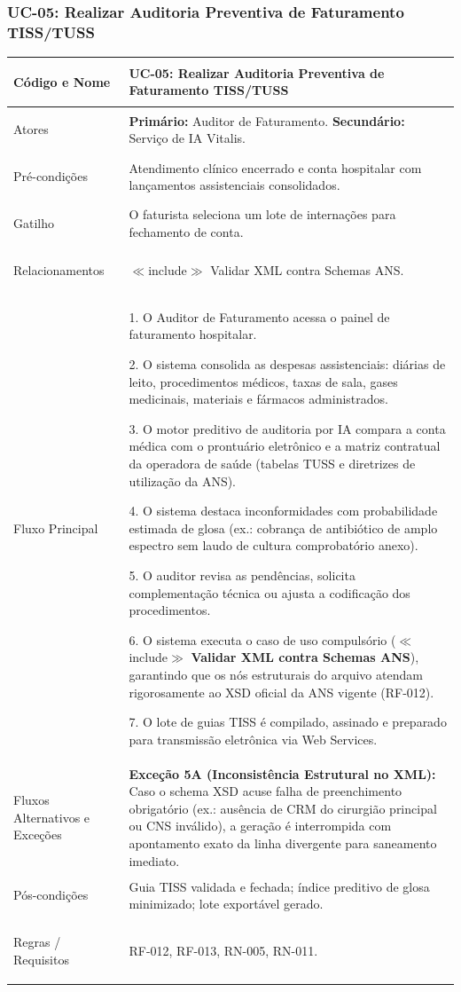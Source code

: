 \subsubsection{UC-05: Realizar Auditoria Preventiva de Faturamento TISS/TUSS}
\label{sec:uc05}

\begingroup
\small
\begin{tabularx}{\textwidth}{>{\bfseries\raggedright\arraybackslash}p{3.4cm} X}
\toprule
Código e Nome & UC-05: Realizar Auditoria Preventiva de Faturamento TISS/TUSS \\
\midrule
Atores & \textbf{Primário:} Auditor de Faturamento. \textbf{Secundário:} Serviço de IA Vitalis. \\
Pré-condições & Atendimento clínico encerrado e conta hospitalar com lançamentos assistenciais consolidados. \\
Gatilho & O faturista seleciona um lote de internações para fechamento de conta. \\
Relacionamentos & $\ll$include$\gg$ Validar XML contra Schemas ANS. \\
\midrule
Fluxo Principal & 
1. O Auditor de Faturamento acessa o painel de faturamento hospitalar.\par
2. O sistema consolida as despesas assistenciais: diárias de leito, procedimentos médicos, taxas de sala, gases medicinais, materiais e fármacos administrados.\par
3. O motor preditivo de auditoria por IA compara a conta médica com o prontuário eletrônico e a matriz contratual da operadora de saúde (tabelas TUSS e diretrizes de utilização da ANS).\par
4. O sistema destaca inconformidades com probabilidade estimada de glosa (ex.: cobrança de antibiótico de amplo espectro sem laudo de cultura comprobatório anexo).\par
5. O auditor revisa as pendências, solicita complementação técnica ou ajusta a codificação dos procedimentos.\par
6. O sistema executa o caso de uso compulsório ($\ll$include$\gg$ \textbf{Validar XML contra Schemas ANS}), garantindo que os nós estruturais do arquivo atendam rigorosamente ao XSD oficial da ANS vigente (RF-012).\par
7. O lote de guias TISS é compilado, assinado e preparado para transmissão eletrônica via Web Services. \\
\midrule
Fluxos Alternativos e Exceções & 
\textbf{Exceção 5A (Inconsistência Estrutural no XML):} Caso o schema XSD acuse falha de preenchimento obrigatório (ex.: ausência de CRM do cirurgião principal ou CNS inválido), a geração é interrompida com apontamento exato da linha divergente para saneamento imediato. \\
\midrule
Pós-condições & Guia TISS validada e fechada; índice preditivo de glosa minimizado; lote exportável gerado. \\
Regras / Requisitos & RF-012, RF-013, RN-005, RN-011. \\
\bottomrule
\end{tabularx}
\endgroup

